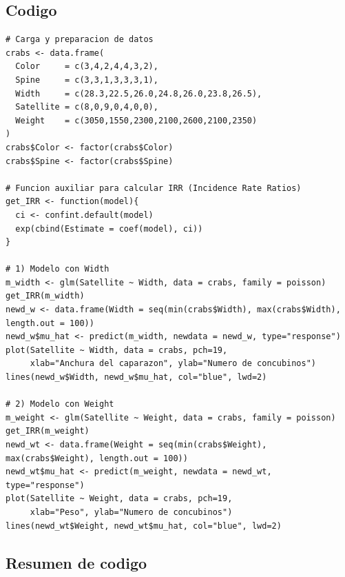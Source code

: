 

\subsection{Codigo}

\begin{lstlisting}[caption={Modelos de Regresion de Poisson para Cangrejos Cacerola}, label={lst:glm_crabs}]
# Carga y preparacion de datos
crabs <- data.frame(
  Color     = c(3,4,2,4,4,3,2),
  Spine     = c(3,3,1,3,3,3,1),
  Width     = c(28.3,22.5,26.0,24.8,26.0,23.8,26.5),
  Satellite = c(8,0,9,0,4,0,0),
  Weight    = c(3050,1550,2300,2100,2600,2100,2350)
)
crabs$Color <- factor(crabs$Color)
crabs$Spine <- factor(crabs$Spine)

# Funcion auxiliar para calcular IRR (Incidence Rate Ratios)
get_IRR <- function(model){
  ci <- confint.default(model)
  exp(cbind(Estimate = coef(model), ci))
}

# 1) Modelo con Width
m_width <- glm(Satellite ~ Width, data = crabs, family = poisson)
get_IRR(m_width)
newd_w <- data.frame(Width = seq(min(crabs$Width), max(crabs$Width), length.out = 100))
newd_w$mu_hat <- predict(m_width, newdata = newd_w, type="response")
plot(Satellite ~ Width, data = crabs, pch=19,
     xlab="Anchura del caparazon", ylab="Numero de concubinos")
lines(newd_w$Width, newd_w$mu_hat, col="blue", lwd=2)

# 2) Modelo con Weight
m_weight <- glm(Satellite ~ Weight, data = crabs, family = poisson)
get_IRR(m_weight)
newd_wt <- data.frame(Weight = seq(min(crabs$Weight), max(crabs$Weight), length.out = 100))
newd_wt$mu_hat <- predict(m_weight, newdata = newd_wt, type="response")
plot(Satellite ~ Weight, data = crabs, pch=19,
     xlab="Peso", ylab="Numero de concubinos")
lines(newd_wt$Weight, newd_wt$mu_hat, col="blue", lwd=2)
\end{lstlisting}

\subsection{Resumen de codigo}

